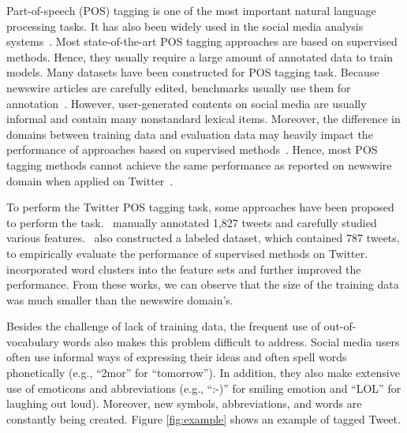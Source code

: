 \documentclass[11pt,letterpaper]{article}
\begin{document}
Part-of-speech (POS) tagging is one of the most important natural language processing tasks. It has also been widely used in the social media analysis systems~\cite{ritter2012open,lamb2013separating,kiritchenko2014sentiment}. Most state-of-the-art POS tagging approaches are based on supervised methods. Hence, they usually require a large amount of annotated data to train models. Many datasets have been constructed for POS tagging task. Because newswire articles are carefully edited, benchmarks usually use them for annotation~\cite{marcus1993building}. However, user-generated contents on social media are usually informal and contain many nonstandard lexical items. Moreover, the difference in domains between training data and evaluation data may heavily impact the performance of approaches based on supervised methods~\cite{caruana2006empirical}. Hence, most POS tagging methods cannot achieve the same performance as reported on newswire domain when applied on Twitter~\cite{owoputi2013improved}.

To perform the Twitter POS tagging task, some approaches have been proposed to perform the task.~\citet{gimpel2011part} manually annotated 1,827 tweets and carefully studied various features.~\citet{ritter2011named} also constructed a labeled dataset, which contained 787 tweets, to empirically evaluate the performance of supervised methods on Twitter.~\citet{owoputi2013improved} incorporated word clusters into the feature sets and further improved the performance. From these works, we can observe that the size of the training data was much smaller than the newswire domain's. 

Besides the challenge of lack of training data, the frequent use of out-of-vocabulary words also makes this problem difficult to address. Social media users often use informal ways of expressing their ideas and often spell words phonetically (e.g., ``2mor'' for ``tomorrow''). In addition, they also make extensive use of emoticons and abbreviations (e.g., ``:-)'' for smiling emotion and ``LOL'' for laughing out loud). Moreover, new symbols, abbreviations, and words are constantly being created. Figure \ref{fig:example} shows an example of tagged Tweet. 
\end{document}
